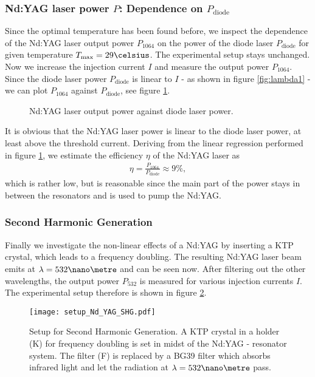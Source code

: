 \subsubsection{Nd:YAG laser power $P$: Dependence on $P_\text{diode}$}
Since the optimal temperature has been found before, we inspect the dependence of the Nd:YAG laser output power $P_{1064}$ on the power of the diode laser $P_\text{diode}$ for given temperature $T_\text{max}=29\celsius$. The experimental setup stays unchanged. Now we increase the injection current $I$ and measure the output power $P_{1064}$. Since the diode laser power $P_\text{diode}$ is linear to $I$ - as shown in figure \ref{fig:lambda1} - we can plot $P_{1064}$ against $P_\text{diode}$, see figure \ref{fig:P1064}.

\begin{figure}[h]
	\centering
	
	\caption{Nd:YAG laser output power against diode laser power.}
	\label{fig:P1064}
\end{figure}

It is obvious that the Nd:YAG laser power is linear to the diode laser power, at least above the threshold current. Deriving from the linear regression performed in figure \ref{fig:P1064}, we estimate the efficiency $\eta$ of the Nd:YAG laser as
\begin{align}
\eta=\tfrac{P_{1064}}{P_\text{diode}}\approx 9\%,
\end{align}
which is rather low, but is reasonable since the main part of the power stays in between the resonators and is used to pump the Nd:YAG.
\subsubsection{Second Harmonic Generation}
Finally we investigate the non-linear effects of a Nd:YAG by inserting a KTP crystal, which leads to a frequency doubling. The resulting Nd:YAG laser beam emits at $\lambda=532\nano\metre$ and can be seen now. After filtering out the other wavelengths, the output power $P_{532}$ is measured for various injection currents $I$. The experimental setup therefore is shown in figure \ref{fig:setup_Nd:YAG_SHG}.

\begin{figure}
	\centering
	\texttt{[image: setup\_Nd\_YAG\_SHG.pdf]}
	\caption[Setup for Second Harmonic Generation]{Setup for Second Harmonic Generation. A KTP crystal in a holder (K) for frequency doubling is set in midst of the Nd:YAG - resonator system. The filter (F) is replaced by a BG39 filter which absorbs infrared light and let the radiation at $\lambda=532\nano\metre$ pass. \cite{lit:manual}}
	\label{fig:setup_Nd:YAG_SHG}
\end{figure}

